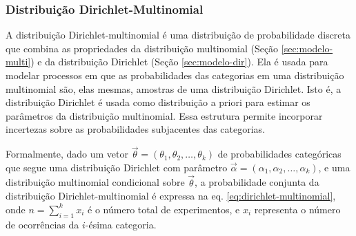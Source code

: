 






\subsubsection{Distribuição Dirichlet-Multinomial}
\label{sec:modelo-dir-multi}

A distribuição Dirichlet-multinomial \citep{distbook-dirichlet} é uma distribuição de probabilidade discreta que combina as propriedades da distribuição multinomial (Seção \ref{sec:modelo-multi}) e da distribuição Dirichlet (Seção \ref{sec:modelo-dir}). Ela é usada para modelar processos em que as probabilidades das categorias em uma distribuição multinomial são, elas mesmas, amostras de uma distribuição Dirichlet. Isto é, a distribuição Dirichlet é usada como distribuição a priori para estimar os parâmetros da distribuição multinomial. Essa estrutura permite incorporar incertezas sobre as probabilidades subjacentes das categorias.

Formalmente, dado um vetor \( \vec{\theta} = (\theta_1, \theta_2, \dots, \theta_k) \) de probabilidades categóricas que segue uma distribuição Dirichlet com parâmetro \( \vec{\alpha} = (\alpha_1, \alpha_2, \dots, \alpha_k) \), e uma distribuição multinomial condicional sobre \( \vec{\theta} \), a probabilidade conjunta da distribuição Dirichlet-multinomial é expressa na eq. \eqref{eq:dirichlet-multinomial}, onde \( n = \sum_{i=1}^k x_i \) é o número total de experimentos, e \( x_i \) representa o número de ocorrências da \( i \)-ésima categoria.

